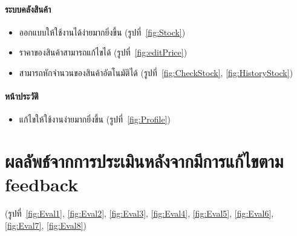 \paragraph{ระบบคลังสินค้า}
\begin{itemize}
    \item ออกแบบให้ใช้งานได้ง่ายมากยิ่งขึ้น (รูปที่~\ref{fig:Stock})
    \item ราคาของสินค้าสามารถแก้ไขได้ (รูปที่~\ref{fig:editPrice})
    \item สามารถหักจำนวนของสินค้าอัตโนมัติได้ (รูปที่~\ref{fig:CheckStock}, \ref{fig:HistoryStock})
\end{itemize}
\paragraph{หน้าประวัติ}
\begin{itemize}
    \item แก้ไขให้ใช้งานง่ายมากยิ่งขึ้น (รูปที่~\ref{fig:Profile})
\end{itemize}


\section{ผลลัพธ์จากการประเมินหลังจากมีการแก้ไขตาม feedback}
(รูปที่~\ref{fig:Eval1}, \ref{fig:Eval2}, \ref{fig:Eval3}, \ref{fig:Eval4}, \ref{fig:Eval5}, \ref{fig:Eval6}, \ref{fig:Eval7}, \ref{fig:Eval8})

